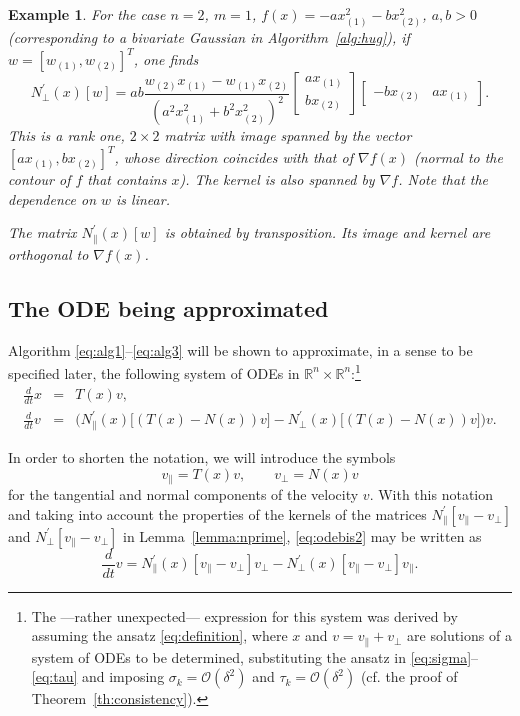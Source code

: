 \documentclass[10pt]{article}
\newcommand{\Npperp}{N^\prime_\perp}
\newcommand{\Nppar}{N^\prime_\|}
\newcommand{\bbR}{\mathbb R}
\newcommand{\vperp}{v_\perp}
\newcommand{\vpar}{v_\|}
\newtheorem{example}[proposition]{Example}
\begin{document}
\begin{example}\label{ex:gaussian} For the case \(n=2\), \(m=1\), \(f(x) = -ax_{(1)}^2-bx_{(2)}^2\), \(a,b>0\) (corresponding to a bivariate Gaussian in Algorithm~\ref{alg:hug}), if \(w=[w_{(1)},w_{(2)}]^T\), one finds
\[
\Npperp(x)[w] =ab \frac{w_{(2)}x_{(1)}-w_{(1)}x_{(2)}}{(a^2x_{(1)}^2+b^2x_{(2)}^2)^2}
\begin{bmatrix}ax_{(1)}\\ bx_{(2)}
\end{bmatrix}
\begin{bmatrix}-bx_{(2)}& ax_{(1)}
\end{bmatrix}.
\]
This is a rank one, \(2\times 2\) matrix with image spanned by the vector
\([ax_{(1)}, bx_{(2)}]^T\), whose direction coincides with that of \(\nabla f(x)\) (normal to the contour of \(f\) that contains \(x\)). The kernel is also spanned by \(\nabla f\). Note that the dependence on \(w\) is linear.

The matrix \(\Nppar(x)[w] \) is obtained by transposition. Its image and kernel are orthogonal to \(\nabla f(x)\).
\end{example}

\subsection{The ODE being approximated} \label{subsec:ODE-the-equations}

Algorithm  \eqref{eq:alg1}--\eqref{eq:alg3} will be shown  to approximate, in a sense to be specified later, the following system   of ODEs in \(\bbR^n\times \bbR^n\):\footnote{The ---rather unexpected--- expression for this system was derived by assuming the ansatz \eqref{eq:definition}, where \(x\) and \(v= \vpar+\vperp\) are solutions of a system of ODEs to be determined, substituting the ansatz in \eqref{eq:sigma}--\eqref{eq:tau} and imposing \(\sigma_k= \mathcal{O}(\delta^2)\) and \(\tau_k= \mathcal{O}(\delta^2)\) (cf. the proof of
 Theorem~\ref{th:consistency}). }
\begin{eqnarray}
\label{eq:odebis1}
\frac{d}{dt} x &=& T(x)v,\\
%
\label{eq:odebis2}
\frac{d}{dt} v &=&\Big(\Nppar(x)\big[(T(x)-N(x))v\big]-\Npperp(x)\big[(T(x)-N(x))v\big]\Big)v.
\end{eqnarray}

In order to shorten the notation, we will  introduce the symbols
\[\vpar = T(x)v,\qquad \vperp = N(x)v
\]
for the tangential and normal components of the velocity \(v\).
With this notation and taking into account the properties of the kernels of the matrices \(\Nppar[\vpar-\vperp]\) and \(\Npperp[\vpar-\vperp]\) in Lemma~\ref{lemma:nprime}, \eqref{eq:odebis2} may be written as
\begin{equation}\label{eq:odebis3}
\frac{d}{dt} v = \Nppar(x)[\vpar-\vperp]\vperp-\Npperp(x)[\vpar-\vperp]\vpar.
\end{equation}
\end{document}
